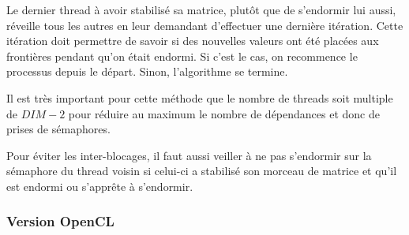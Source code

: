 Le dernier thread à avoir stabilisé sa matrice, plutôt que de
s'endormir lui aussi, réveille tous les autres en leur demandant
d'effectuer une dernière itération. Cette itération doit permettre de
savoir si des nouvelles valeurs ont été placées aux frontières pendant
qu'on était endormi. Si c'est le cas, on recommence le processus
depuis le départ. Sinon, l'algorithme se termine.
\medskip

Il est très important pour cette méthode que le nombre de threads soit
multiple de $DIM-2$ pour réduire au maximum le nombre de dépendances
et donc de prises de sémaphores.
\medskip

Pour éviter les inter-blocages, il faut aussi veiller à ne pas
s'endormir sur la sémaphore du thread voisin si celui-ci a stabilisé
son morceau de matrice et qu'il est endormi ou s'apprête à s'endormir.
\medskip

\subsubsection{Version OpenCL}

